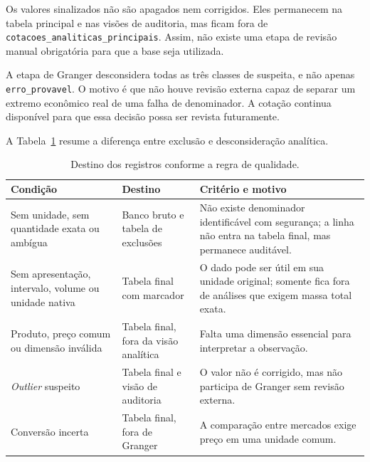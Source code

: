 \documentclass[12pt,a4paper]{article}
\begin{document}
Os valores sinalizados não são apagados nem corrigidos. Eles permanecem na
tabela principal e nas visões de auditoria, mas ficam fora de
\texttt{cotacoes\_analiticas\_principais}. Assim, não existe uma etapa de
revisão manual obrigatória para que a base seja utilizada.

A etapa de Granger desconsidera todas as três classes de suspeita, e não apenas
\texttt{erro\_provavel}. O motivo é que não houve revisão externa capaz de
separar um extremo econômico real de uma falha de denominador. A cotação
continua disponível para que essa decisão possa ser revista futuramente.

A Tabela~\ref{tab:destino-registros} resume a diferença entre exclusão e
desconsideração analítica.

\begin{table}[htbp]
    \centering
    \caption{Destino dos registros conforme a regra de qualidade.}
    \label{tab:destino-registros}
    \scriptsize
    \begin{tabular}{p{3.2cm}p{4.0cm}p{6.2cm}}
        \toprule
        \textbf{Condição} & \textbf{Destino} & \textbf{Critério e motivo} \\
        \midrule
        Sem unidade, sem quantidade exata ou ambígua &
        Banco bruto e tabela de exclusões &
        Não existe denominador identificável com segurança; a linha não entra
        na tabela final, mas permanece auditável. \\
        \addlinespace
        Sem apresentação, intervalo, volume ou unidade nativa &
        Tabela final com marcador &
        O dado pode ser útil em sua unidade original; somente fica fora de
        análises que exigem massa total exata. \\
        \addlinespace
        Produto, preço comum ou dimensão inválida &
        Tabela final, fora da visão analítica &
        Falta uma dimensão essencial para interpretar a observação. \\
        \addlinespace
        \textit{Outlier} suspeito &
        Tabela final e visão de auditoria &
        O valor não é corrigido, mas não participa de Granger sem revisão
        externa. \\
        \addlinespace
        Conversão incerta &
        Tabela final, fora de Granger &
        A comparação entre mercados exige preço em uma unidade comum. \\
        \bottomrule
    \end{tabular}
\end{table}
\end{document}
